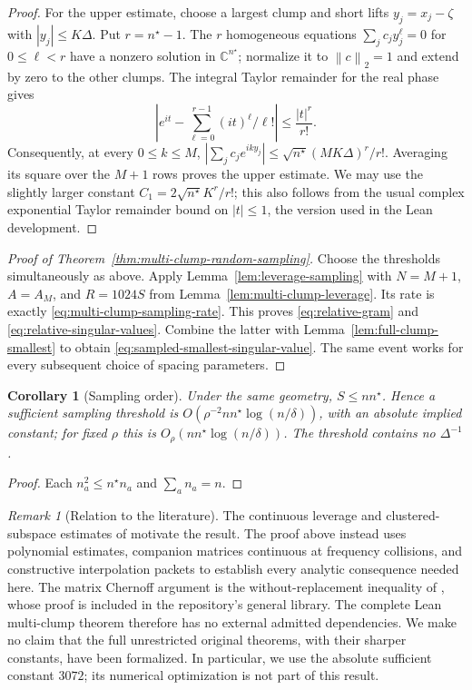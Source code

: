 \documentclass[11pt]{article}
\newtheorem{corollary}[theorem]{Corollary}
\theoremstyle{remark}\newtheorem{remark}[theorem]{Remark}
\newcommand{\C}{\mathbb C}
\newcommand{\norm}[1]{\left\lVert#1\right\rVert}
\newcommand{\abs}[1]{\left|#1\right|}
\begin{document}
\begin{proof}
For the upper estimate, choose a largest clump and short lifts
$y_j=x_j-\zeta$ with $\abs{y_j}\le K\Delta$. Put $r=n^\star-1$.
The $r$ homogeneous equations
$\sum_jc_jy_j^\ell=0$ for $0\le\ell<r$ have a nonzero solution in
$\C^{n^\star}$; normalize it to $\norm c_2=1$ and extend by zero to
the other clumps. The integral Taylor remainder for the real phase gives
\[
 \abs{e^{it}-\sum_{\ell=0}^{r-1}(it)^\ell/\ell!}
 \le\frac{\abs t^r}{r!}.
\]
Consequently, at every $0\le k\le M$,
$\abs{\sum_jc_je^{iky_j}}\le\sqrt{n^\star}(MK\Delta)^r/r!$.
Averaging its square over the $M+1$ rows proves the upper estimate.
We may use the slightly larger constant $C_1=2\sqrt{n^\star}K^r/r!$;
this also follows from the usual complex exponential Taylor remainder
bound on $\abs t\le1$, the version used in the Lean development.
\end{proof}

\begin{proof}[Proof of Theorem~\ref{thm:multi-clump-random-sampling}]
Choose the thresholds simultaneously as above. Apply
Lemma~\ref{lem:leverage-sampling} with $N=M+1$, $A=A_M$, and
$R=1024S$ from Lemma~\ref{lem:multi-clump-leverage}. Its rate is
exactly \eqref{eq:multi-clump-sampling-rate}. This proves
\eqref{eq:relative-gram} and \eqref{eq:relative-singular-values}.
Combine the latter with Lemma~\ref{lem:full-clump-smallest} to obtain
\eqref{eq:sampled-smallest-singular-value}. The same event works for
every subsequent choice of spacing parameters.
\end{proof}

\begin{corollary}[Sampling order]\label{cor:clump-sampling-order}
Under the same geometry, $S\le nn^\star$. Hence a sufficient sampling
threshold is $O(\rho^{-2}nn^\star\log(n/\delta))$, with an absolute implied
constant; for fixed $\rho$ this is $O_\rho(nn^\star\log(n/\delta))$. The threshold contains no $\Delta^{-1}$.
\end{corollary}
\begin{proof}
Each $n_a^2\le n^\star n_a$ and $\sum_an_a=n$.
\end{proof}

\begin{remark}[Relation to the literature]
The continuous leverage and clustered-subspace estimates of
\cite{EMM,BG,BDGY} motivate the result. The proof above instead uses
polynomial estimates, companion matrices continuous at frequency
collisions, and constructive interpolation packets to establish every
analytic consequence needed here. The matrix Chernoff argument is the
without-replacement inequality of \cite{Tropp}, whose proof is included in
the repository's general library. The complete Lean multi-clump theorem
therefore has no external admitted dependencies. We make no claim that the
full unrestricted original theorems, with their sharper constants, have
been formalized. In particular, we use the absolute sufficient constant
$3072$; its numerical optimization is not part of this result.
\end{remark}
\end{document}
